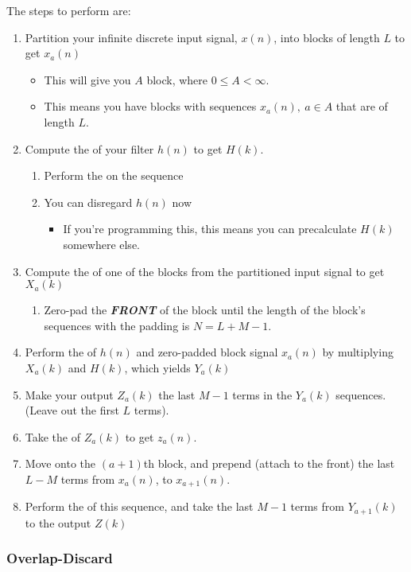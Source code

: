 The steps to perform  are:
\begin{enumerate}[noitemsep]
\item Partition your infinite discrete input signal, $x(n)$, into blocks of length $L$ to get $x_{a}(n)$
  \begin{itemize}[noitemsep]
  \item This will give you $A$ block, where $0 \leq A < \infty$.
  \item This means you have blocks with sequences $x_{a}(n), \: a \in A$ that are of length $L$.
  \end{itemize}
\item Compute the  of your filter $h(n)$ to get $H(k)$.
  \begin{enumerate}[noitemsep]
  \item Perform the  on the sequence
  \item You can disregard $h(n)$ now
    \begin{itemize}[noitemsep]
    \item If you're programming this, this means you can precalculate $H(k)$ somewhere else.
    \end{itemize}
  \end{enumerate}
\item Compute the  of one of the blocks from the partitioned input signal to get $X_{a}(k)$
  \begin{enumerate}[noitemsep]
  \item Zero-pad the \textbf{\emph{FRONT}} of the block until the length of the block's sequences with the padding is $N=L+M-1$.
  \end{enumerate}
\item Perform the  of $h(n)$ and zero-padded block signal $x_{a}(n)$ by multiplying $X_{a}(k)$ and $H(k)$, which yields $Y_{a}(k)$
\item Make your output $Z_{a}(k)$ the last $M-1$ terms in the $Y_{a}(k)$ sequences. (Leave out the first $L$ terms).
\item Take the  of $Z_{a}(k)$ to get $z_{a}(n)$.
\item Move onto the $(a+1)$th block, and prepend (attach to the front) the last $L-M$ terms from $x_{a}(n)$, to $x_{a+1}(n)$.
\item Perform the  of this sequence, and take the last $M-1$ terms from $Y_{a+1}(k)$ to the output $Z(k)$
\end{enumerate}

\subsubsection{Overlap-Discard}\label{subsubsec:DFT_Application-Overlap_Discard}

